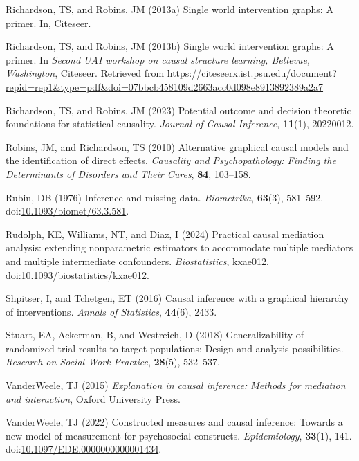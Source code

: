 \documentclass[
  single column]{article}
\newlength{\cslhangindent}
\newenvironment{CSLReferences}[2] %
 {\begin{list}{}{%
  \setlength{\itemindent}{0pt}
  \setlength{\leftmargin}{0pt}
  \setlength{\parsep}{0pt}
  \ifodd #1
   \setlength{\leftmargin}{\cslhangindent}
   \setlength{\itemindent}{-1\cslhangindent}
  \fi
  \setlength{\itemsep}{#2\baselineskip}}}
 {\end{list}}
\begin{document}
\begin{CSLReferences}{1}{0}
Richardson, TS, and Robins, JM (2013a) Single world intervention graphs:
A primer. In, Citeseer.

Richardson, TS, and Robins, JM (2013b) Single world intervention graphs:
A primer. In \emph{Second UAI workshop on causal structure learning,
{B}ellevue, {W}ashington}, Citeseer. Retrieved from
\url{https://citeseerx.ist.psu.edu/document?repid=rep1&type=pdf&doi=07bbcb458109d2663acc0d098e8913892389a2a7}

Richardson, TS, and Robins, JM (2023) Potential outcome and decision
theoretic foundations for statistical causality. \emph{Journal of Causal
Inference}, \textbf{11}(1), 20220012.

Robins, JM, and Richardson, TS (2010) Alternative graphical causal
models and the identification of direct effects. \emph{Causality and
Psychopathology: Finding the Determinants of Disorders and Their Cures},
\textbf{84}, 103--158.

Rubin, DB (1976) Inference and missing data. \emph{Biometrika},
\textbf{63}(3), 581--592.
doi:\href{https://doi.org/10.1093/biomet/63.3.581}{10.1093/biomet/63.3.581}.

Rudolph, KE, Williams, NT, and Diaz, I (2024) {Practical causal
mediation analysis: extending nonparametric estimators to accommodate
multiple mediators and multiple intermediate confounders}.
\emph{Biostatistics}, kxae012.
doi:\href{https://doi.org/10.1093/biostatistics/kxae012}{10.1093/biostatistics/kxae012}.

Shpitser, I, and Tchetgen, ET (2016) Causal inference with a graphical
hierarchy of interventions. \emph{Annals of Statistics}, \textbf{44}(6),
2433.

Stuart, EA, Ackerman, B, and Westreich, D (2018) Generalizability of
randomized trial results to target populations: Design and analysis
possibilities. \emph{Research on Social Work Practice}, \textbf{28}(5),
532--537.

VanderWeele, TJ (2015) \emph{Explanation in causal inference: Methods
for mediation and interaction}, Oxford University Press.

VanderWeele, TJ (2022) Constructed measures and causal inference:
Towards a new model of measurement for psychosocial constructs.
\emph{Epidemiology}, \textbf{33}(1), 141.
doi:\href{https://doi.org/10.1097/EDE.0000000000001434}{10.1097/EDE.0000000000001434}.


\end{CSLReferences}
\end{document}
